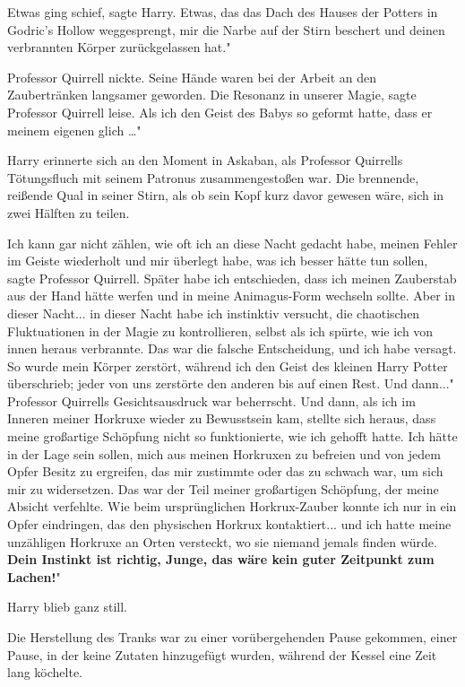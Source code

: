 Etwas ging schief\grqq{}, sagte Harry. \glqq Etwas, das das Dach des Hauses der
Potters in Godric's Hollow weggesprengt, mir die Narbe auf der Stirn beschert
und deinen verbrannten Körper zurückgelassen hat."

Professor Quirrell nickte. Seine Hände waren bei der Arbeit an den Zaubertränken
langsamer geworden. \glqq Die Resonanz in unserer Magie\grqq{}, sagte Professor
Quirrell leise. \glqq Als ich den Geist des Babys so geformt hatte, dass er
meinem eigenen glich …"

Harry erinnerte sich an den Moment in Askaban, als Professor Quirrells
Tötungsfluch mit seinem Patronus zusammengestoßen war. Die brennende, reißende
Qual in seiner Stirn, als ob sein Kopf kurz davor gewesen wäre, sich in zwei
Hälften zu teilen.

\glqq Ich kann gar nicht zählen, wie oft ich an diese Nacht gedacht habe, meinen
Fehler im Geiste wiederholt und mir überlegt habe, was ich besser hätte tun
sollen\grqq{}, sagte Professor Quirrell. \glqq Später habe ich entschieden, dass
ich meinen Zauberstab aus der Hand hätte werfen und in meine Animagus-Form
wechseln sollte. Aber in dieser Nacht... in dieser Nacht habe ich instinktiv
versucht, die chaotischen Fluktuationen in der Magie zu kontrollieren, selbst
als ich spürte, wie ich von innen heraus verbrannte. Das war die falsche
Entscheidung, und ich habe versagt. So wurde mein Körper zerstört, während ich
den Geist des kleinen Harry Potter überschrieb; jeder von uns zerstörte den
anderen bis auf einen Rest. Und dann..." Professor Quirrells Gesichtsausdruck
war beherrscht. \glqq Und dann, als ich im Inneren meiner Horkruxe wieder zu
Bewusstsein kam, stellte sich heraus, dass meine großartige Schöpfung nicht so
funktionierte, wie ich gehofft hatte. Ich hätte in der Lage sein sollen, mich
aus meinen Horkruxen zu befreien und von jedem Opfer Besitz zu ergreifen, das
mir zustimmte oder das zu schwach war, um sich mir zu widersetzen. Das war der
Teil meiner großartigen Schöpfung, der meine Absicht verfehlte. Wie beim
ursprünglichen Horkrux-Zauber konnte ich nur in ein Opfer eindringen, das den
physischen Horkrux kontaktiert... und ich hatte meine unzähligen Horkruxe an
Orten versteckt, wo sie niemand jemals finden würde. \textbf{Dein Instinkt ist
richtig, Junge, das wäre kein guter Zeitpunkt zum Lachen!}"

Harry blieb ganz still.

Die Herstellung des Tranks war zu einer vorübergehenden Pause gekommen, einer
Pause, in der keine Zutaten hinzugefügt wurden, während der Kessel eine Zeit
lang köchelte.

